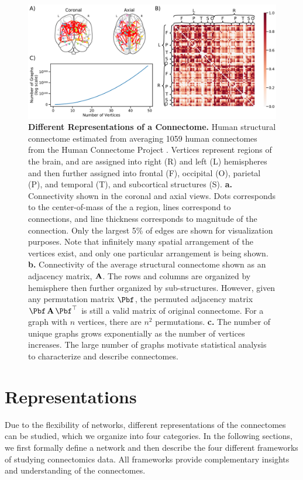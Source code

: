 \begin{figure}
    \centering
    \includegraphics[width=\textwidth]{figures/dnd/intro}
    \caption{
    \textbf{Different Representations of a Connectome.} 
    Human structural connectome estimated from averaging 1059 human connectomes from the Human Connectome Project \citep{hcp1}.
    Vertices represent regions of the brain, and are assigned into right (R) and left (L) hemispheres and then further assigned into frontal (F), occipital (O), parietal (P), and temporal (T), and subcortical structures (S). 
    \textbf{a.} Connectivity shown in the coronal and axial views. Dots corresponds to the center-of-mass of the a region, lines correspond to connections, and line thickness corresponds to magnitude of the connection. Only the largest 5\% of edges are shown for visualization purposes. Note that infinitely many spatial arrangement of the vertices exist, and only one particular arrangement is being shown.
    \textbf{b.} Connectivity of the average structural connectome shown as an adjacency matrix, $\operatorname{\mathbf{A}}$. The rows and columns are organized by hemisphere then further organized by sub-structures. However, given any permutation matrix $\Pbf$, the permuted adjacency matrix $\Pbf\A\Pbf^\top$ is still a valid matrix of original connectome. For a graph with $n$ vertices, there are $n^2$ permutations.
    \textbf{c.} The number of unique graphs grows exponentially as the number of vertices increases. The large number of graphs motivate statistical analysis to characterize and describe connectomes.
    } 
    \label{fig:intro_fig}
\end{figure}


\section{Representations}\label{sec:representations}
Due to the flexibility of networks, different representations of the connectomes can be studied, which we organize into four categories. In the following sections, we first formally define a network and then describe the four different frameworks of studying connectomics data. All frameworks provide complementary insights and understanding of the connectomes. 

